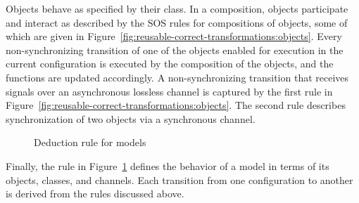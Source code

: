 Objects behave as specified by their class.
In a composition, objects participate and interact as described by the SOS rules for compositions of objects, some of which are given in Figure~\ref{fig:reusable-correct-transformations:objects}.
Every non-synchronizing transition of one of the objects enabled for execution in the current configuration is executed by the composition of the objects, and the functions are updated accordingly.
A non-synchronizing transition that receives signals over an asynchronous lossless channel is captured by the first rule in Figure~\ref{fig:reusable-correct-transformations:objects}.
The second rule describes synchronization of two objects via a synchronous channel.

\begin{figure}[hbt]
\centering
{}
\caption{Deduction rule for models}
\label{fig:reusable-correct-transformations:models}
\end{figure}

Finally, the rule in Figure~\ref{fig:reusable-correct-transformations:models} defines the behavior of a model in terms of its objects, classes, and channels.
Each transition from one configuration to another is derived from the rules discussed above. 